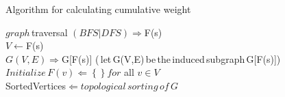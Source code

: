 \documentclass[11pt,UTF8]{ctexart}
\begin{document}
  
	 \begin{algorithm}[H]
		\caption{Algorithm for calculating cumulative weight}
			$graph\,$traversal $(BFS|DFS) \Rightarrow  $F(s)\; \\
			$V \gets $F(s)\; \\
			$G(V,E) \Rightarrow $G[F(s)]\,\,(\,let\,G(V,E)\,be\,the\,induced\,subgraph\,G[F(s)])\;   \\
			$Initialize\,F(v) \Leftarrow \left\{ \right\} for$ all $v\in V$\; \\
			SortedVertices$ \Leftarrow topological\,sorting\,of\,G$ \; \\
	\end{algorithm}  
\end{document}
